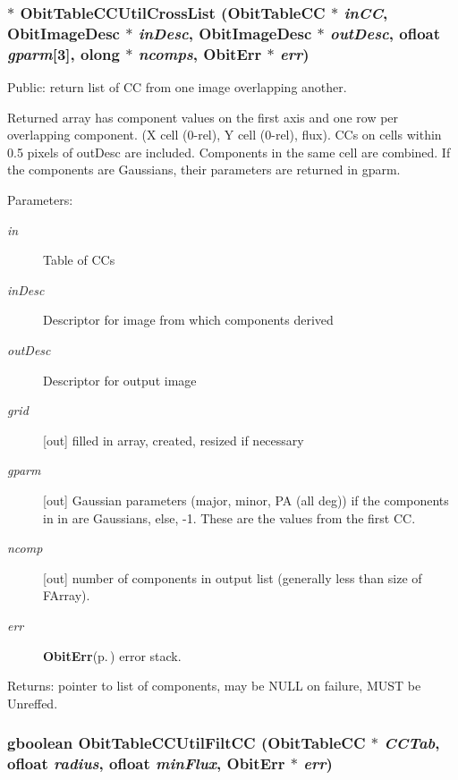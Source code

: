 \subsubsection{$\ast$ Obit\-Table\-CCUtil\-Cross\-List ({\bf Obit\-Table\-CC} $\ast$ {\em in\-CC}, {\bf Obit\-Image\-Desc} $\ast$ {\em in\-Desc}, {\bf Obit\-Image\-Desc} $\ast$ {\em out\-Desc}, {\bf ofloat} {\em gparm}[3], {\bf olong} $\ast$ {\em ncomps}, {\bf Obit\-Err} $\ast$ {\em err})}\label{ObitTableCCUtil_8h_a10}


Public: return list of CC from one image overlapping another. 

Returned array has component values on the first axis and one row per overlapping component. (X cell (0-rel), Y cell (0-rel), flux). CCs on cells within 0.5 pixels of out\-Desc are included. Components in the same cell are combined. If the components are Gaussians, their parameters are returned in gparm. \begin{Desc}
\item[Parameters:]
\begin{description}
\item[{\em in}]Table of CCs \item[{\em in\-Desc}]Descriptor for image from which components derived \item[{\em out\-Desc}]Descriptor for output image \item[{\em grid}][out] filled in array, created, resized if necessary \item[{\em gparm}][out] Gaussian parameters (major, minor, PA (all deg)) if the components in in are Gaussians, else, -1. These are the values from the first CC. \item[{\em ncomp}][out] number of components in output list (generally less than size of FArray). \item[{\em err}]{\bf Obit\-Err}{\rm (p.\,\pageref{structObitErr})} error stack. \end{description}
\end{Desc}
\begin{Desc}
\item[Returns:]pointer to list of components, may be NULL on failure, MUST be Unreffed. \end{Desc}
\subsubsection{\setlength{\rightskip}{0pt plus 5cm}gboolean Obit\-Table\-CCUtil\-Filt\-CC ({\bf Obit\-Table\-CC} $\ast$ {\em CCTab}, {\bf ofloat} {\em radius}, {\bf ofloat} {\em min\-Flux}, {\bf Obit\-Err} $\ast$ {\em err})}\label{ObitTableCCUtil_8h_a16}


